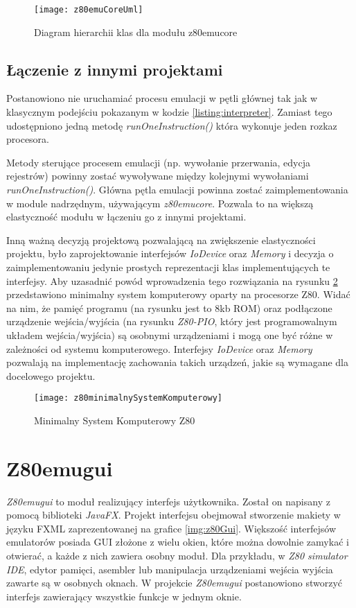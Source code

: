 	\begin{figure}[h]
		\centering
		\texttt{[image: z80emuCoreUml]}
		\caption{Diagram hierarchii klas dla modułu z80emu{\dywiz}core}
		\label{img:z80emuCoreUml}
	\end{figure}
	
	\subsection{Łączenie z innymi projektami}
		
	Postanowiono nie uruchamiać procesu emulacji w pętli głównej tak jak w klasycznym podejściu pokazanym w kodzie \ref{listing:interpreter}. Zamiast tego udostępniono jedną metodę \emph{runOneInstruction()} która wykonuje jeden rozkaz procesora.
	
	Metody sterujące procesem emulacji (np. wywołanie przerwania, edycja rejestrów) powinny zostać wywoływane między kolejnymi wywołaniami \emph{runOneInstruction()}. Główna pętla emulacji powinna zostać zaimplementowania w module nadrzędnym, używającym \emph{z80emu{\dywiz}core}. Pozwala to na większą elastyczność modułu w łączeniu go z innymi projektami.
	
	Inną ważną decyzją projektową pozwalającą na zwiększenie elastyczności projektu, było zaprojektowanie interfejsów \emph{IoDevice} oraz \emph{Memory} i decyzja o zaimplementowaniu jedynie prostych reprezentacji klas implementujących te interfejsy.
	Aby uzasadnić powód wprowadzenia tego rozwiązania na rysunku \ref{img:z80minimalnySystemKomputerowy} przedstawiono minimalny system komputerowy oparty na procesorze Z80.
	Widać na nim, że pamięć programu (na rysunku jest to 8kb ROM) oraz podłączone urządzenie wejścia/wyjścia (na rysunku \emph{Z80-PIO}, który jest programowalnym układem wejścia/wyjścia) są osobnymi urządzeniami i mogą one być różne w zależności od systemu komputerowego. Interfejsy \emph{IoDevice} oraz \emph{Memory} pozwalają na implementację zachowania takich urządzeń, jakie są wymagane dla docelowego projektu. 
	
	
	\begin{figure}[h]
		\centering
		\texttt{[image: z80minimalnySystemKomputerowy]}
		\caption{Minimalny System Komputerowy Z80}
		\label{img:z80minimalnySystemKomputerowy}
	\end{figure}
		
	\section{Z80emu{\dywiz}gui}
	\emph{Z80emu{\dywiz}gui} to moduł realizujący interfejs użytkownika. Został on napisany z pomocą biblioteki \emph{JavaFX}. Projekt interfejsu obejmował stworzenie makiety w języku FXML zaprezentowanej na grafice \ref{img:z80Gui}. Większość interfejsów emulatorów posiada GUI złożone z wielu okien, które można dowolnie zamykać i otwierać, a każde z nich zawiera osobny moduł. Dla przykładu, w \emph{Z80 simulator IDE}, edytor pamięci, asembler lub manipulacja urządzeniami wejścia wyjścia zawarte są w osobnych oknach. 
	W projekcie \emph{Z80emu{\dywiz}gui} postanowiono stworzyć interfejs zawierający wszystkie funkcje w jednym oknie. 
	
